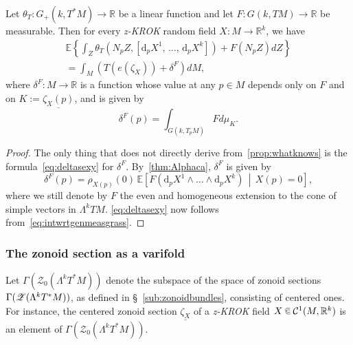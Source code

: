\documentclass[AHL, Unicode, longabstracts, published]{cedram}
\newcommand{\R}{\mathbb{R}}
\newcommand{\EE}{\mathbb{E}}
\newcommand{\ZZ}{\mathscr{Z}}
\newcommand{\dd}{\mathrm{d}}
\newcommand{\mC}{\mathcal{C}}
\newcommand{\seg}{\underline}
\newcommand{\zkrok}{\emph{z-KROK}\xspace}
\newcommand*\randin{
\mathchoice {\raisebox{-.35ex}{$\displaystyle{^\subset}$}\mkern-11.5mu\raisebox{+.45ex}{$\displaystyle{_\subset}$}} {\mkern+1mu\raisebox{-.27ex}{$\textstyle{^\subset}$}\mkern-11.7mu\raisebox{+.45ex}{$\textstyle{_\subset}$}} {\raisebox{.35ex}{$\scriptstyle\subset$}\mkern-14mu\raisebox{-.15ex}{$\scriptstyle\subset$}} {\raisebox{.3ex}{$\scriptscriptstyle\subset$}\mkern-13.5mu\raisebox{-.10ex}{$\scriptscriptstyle\subset$}}}
\begin{document}
\begin{prop}\label{prop:introwhatknows}
Let $\theta_T:G_+(k,T^*M)\to \R$ be a linear function and let $F:G(k,TM)\to \R$ be measurable. Then for every \zkrok random field $X:M\to\R^k$, we have
\begin{multline}\label{eq:introwhatknows}
\EE\left\{\int_Z \theta_T\left( N_pZ,\left[\dd_pX^1,\,\dots,\,\dd_pX^k\right]\right) +F\left( N_pZ\right) dZ\right\}\\
=\int_M \left( T(e(\zeta_X))+\delta^F \right) dM,
\end{multline}
where $\delta^F:M\to \R$ is a function whose value at any $p\in M$ depends only on $F$ and on $K:=\underline{\zeta_X(p)}$, and is given by
\begin{equation}\label{eq:deltasexy}
\delta^F(p)=\int_{G(k,T_pM)}Fd\mu_{K}.
\end{equation}
\end{prop}

\begin{proof}
The only thing that does not directly derive from~\cref{prop:whatknows} is the formula~\eqref{eq:deltasexy} for $\delta^F$. By~\cref{thm:Alphaca}, $\delta^F$ is given by
\begin{equation*}
\delta^F(p)=\rho_{X(p)}(0)\, \EE\left[F\left(\dd_pX^1\wedge \dots \wedge \dd_pX^k\right)\,\middle|\,X(p)=0\right],
\end{equation*}
where we still denote by $F$ the even and homogeneous extension to the cone of simple vectors in $\Lambda^kTM$. \eqref{eq:deltasexy} now follows from~\eqref{eq:intwrtgenmeasgrass}.
\end{proof}


\subsubsection{The zonoid section as a varifold}\label{subsub:varifold}

Let $\Gamma(\ZZ_0(\Lambda^kT^*M))$ denote the subspace of the space of zonoid sections $\Gamma(\ZZ(\Lambda^kT^*\linebreak M))$, as defined in \S~\ref{sub:zonoidbundles}, consisting of centered ones. For instance, the centered zonoid section $ \seg{\zeta_X}$ of a \zkrok field $X\,\randin\, \mC^1(M,\R^k)$ is an element of $\Gamma(\ZZ_0(\Lambda^kT^*M))$.
\end{document}
